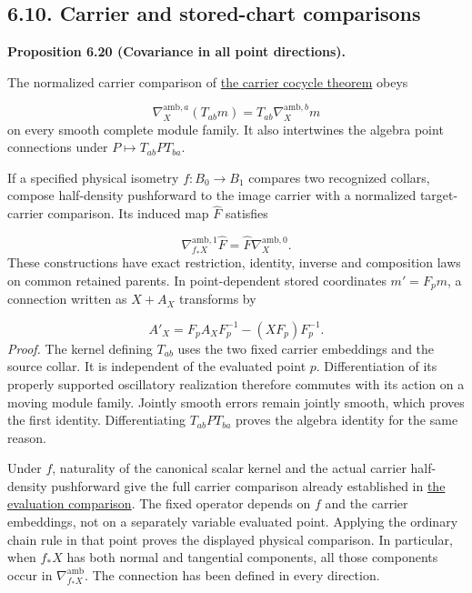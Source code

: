 \documentclass[
  english,
  11pt,
  reqno]{amsart}
\makeatletter
\newcommand{\pandocstatementheading}[1]{%
  \par\addpenalty{\@beginparpenalty}%
  \addvspace{.5\baselineskip plus .2\baselineskip minus .2\baselineskip}%
  {\normalfont\bfseries #1\par}%
  \nobreak\@afterindenttrue\@afterheading
}
\makeatother
\begin{document}
\subsection{6.10. Carrier and stored-chart
comparisons}\label{carrier-and-stored-chart-comparisons}\label{sec:online-point-connection-covariance}

\pandocstatementheading{\leavevmode{}\label{prop:online-ambient-carrier-covariance}Proposition 6.20 (Covariance in all point directions).}

The normalized carrier comparison of
\hyperref[thm:online-wave-carrier-cocycle]{the carrier cocycle theorem}
obeys

\label{eq:online-ambient-basic-carrier-comparison} \[
\nabla_X^{\mathrm{amb},a}(T_{ab}m)
=T_{ab}\nabla_X^{\mathrm{amb},b}m
\] on every smooth complete module family. It also intertwines the
algebra point connections under \(P\mapsto T_{ab}PT_{ba}\).

If a specified physical isometry \(f:B_0\to B_1\) compares two
recognized collars, compose half-density pushforward to the image
carrier with a normalized target-carrier comparison. Its induced map
\(\widehat F\) satisfies

\label{eq:online-ambient-physical-point-comparison} \[
\nabla_{f_*X}^{\mathrm{amb},1}\widehat F
=\widehat F\nabla_X^{\mathrm{amb},0}.
\] These constructions have exact restriction, identity, inverse and
composition laws on common retained parents. In point-dependent stored
coordinates \(m'=F_pm\), a connection written as \(X+A_X\) transforms by

\label{eq:online-ambient-stored-connection-law} \[
A'_X=F_pA_XF_p^{-1}-(XF_p)F_p^{-1}.
\] \emph{Proof.} The kernel defining \(T_{ab}\) uses the two fixed
carrier embeddings and the source collar. It is independent of the
evaluated point \(p\). Differentiation of its properly supported
oscillatory realization therefore commutes with its action on a moving
module family. Jointly smooth errors remain jointly smooth, which proves
the first identity. Differentiating \(T_{ab}PT_{ba}\) proves the algebra
identity for the same reason.

Under \(f\), naturality of the canonical scalar kernel and the actual
carrier half-density pushforward give the full carrier comparison
already established in
\hyperref[prop:online-wave-full-evaluation-comparison]{the evaluation
comparison}. The fixed operator depends on \(f\) and the carrier
embeddings, not on a separately variable evaluated point. Applying the
ordinary chain rule in that point proves the displayed physical
comparison. In particular, when \(f_*X\) has both normal and tangential
components, all those components occur in
\(\nabla_{f_*X}^{\mathrm{amb}}\). The connection has been defined in
every direction.
\end{document}
